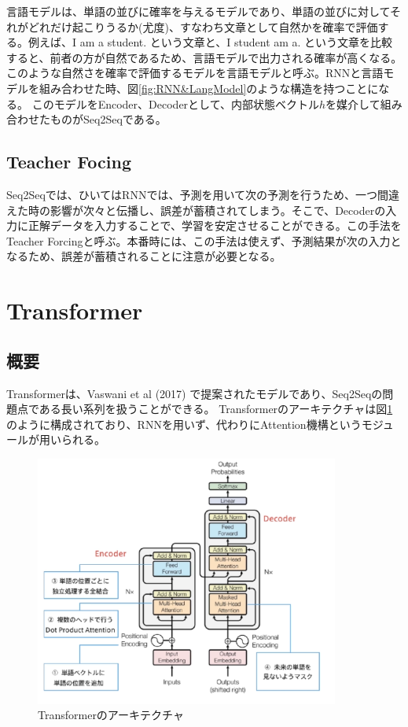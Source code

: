 \documentclass{ltjsarticle}
\begin{document}
言語モデルは、単語の並びに確率を与えるモデルであり、単語の並びに対してそれがどれだけ起こりうるか(尤度)、すなわち文章として自然かを確率で評価する。例えば、I am a student. という文章と、I student am a. という文章を比較すると、前者の方が自然であるため、言語モデルで出力される確率が高くなる。このような自然さを確率で評価するモデルを言語モデルと呼ぶ。RNNと言語モデルを組み合わせた時、図\ref{fig:RNN&LangModel}のような構造を持つことになる。
このモデルをEncoder、Decoderとして、内部状態ベクトル$h$を媒介して組み合わせたものがSeq2Seqである。

\subsection{Teacher Focing}
Seq2Seqでは、ひいてはRNNでは、予測を用いて次の予測を行うため、一つ間違えた時の影響が次々と伝播し、誤差が蓄積されてしまう。そこで、Decoderの入力に正解データを入力することで、学習を安定させることができる。この手法をTeacher Forcingと呼ぶ。本番時には、この手法は使えず、予測結果が次の入力となるため、誤差が蓄積されることに注意が必要となる。

\clearpage
\section{Transformer}
\subsection{概要}
Transformerは、Vaswani et al (2017) で提案されたモデルであり、Seq2Seqの問題点である長い系列を扱うことができる。
Transformerのアーキテクチャは図\ref{fig:Transformer}のように構成されており、RNNを用いず、代わりにAttention機構というモジュールが用いられる。
\begin{figure}[htbp]
  \centering
  \includegraphics[width=10cm]{./capture/Transformer.png}
  \caption{Transformerのアーキテクチャ}
  \label{fig:Transformer}
\end{figure}
\end{document}
